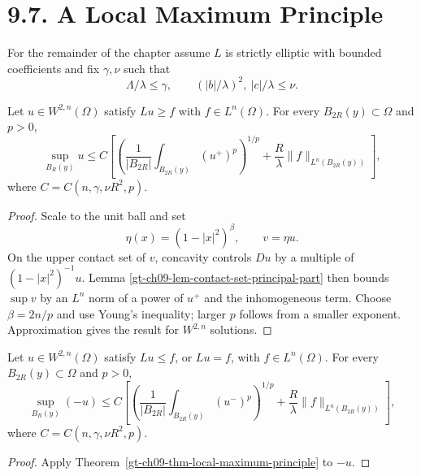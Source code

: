 \section*{9.7. A Local Maximum Principle}

For the remainder of the chapter assume $L$ is strictly elliptic with bounded
coefficients and fix $\gamma,\nu$ such that
\begin{equation}\tag{9.47}
\Lambda/\lambda\le\gamma,
\qquad (|b|/\lambda)^2,\ |c|/\lambda\le\nu.
\end{equation}

\begin{theorem}
\label{gt-ch09-thm-local-maximum-principle}
Let $u\in W^{2,n}(\Omega)$ satisfy $Lu\ge f$ with $f\in L^n(\Omega)$.
For every $B_{2R}(y)\subset\Omega$ and $p>0$,
\begin{equation}\tag{9.48}
\sup_{B_R(y)}u\le C\left[
\left(\frac1{|B_{2R}|}\int_{B_{2R}(y)}(u^+)^p\right)^{1/p}
+\frac R\lambda\|f\|_{L^n(B_{2R}(y))}\right],
\end{equation}
where $C=C(n,\gamma,\nu R^2,p)$.
\end{theorem}
\begin{proof}
\sketch Scale to the unit ball and set
\begin{equation}
\tag{9.49}
\eta(x)=(1-|x|^2)^\beta,
\qquad v=\eta u.
\end{equation}
On the upper contact set of $v$, concavity controls
$Du$ by a multiple of $(1-|x|^2)^{-1}u$.  Lemma
\ref{gt-ch09-lem-contact-set-principal-part} then bounds $\sup v$ by an
$L^n$ norm of a power of $u^+$ and the inhomogeneous term.  Choose
$\beta=2n/p$ and use Young's inequality; larger $p$ follows from a smaller
exponent.  Approximation gives the result for $W^{2,n}$ solutions.
\end{proof}

\begin{corollary}
\label{gt-ch09-cor-local-minimum-principle}
Let $u\in W^{2,n}(\Omega)$ satisfy $Lu\le f$, or $Lu=f$, with
$f\in L^n(\Omega)$.  For every $B_{2R}(y)\subset\Omega$ and $p>0$,
\begin{equation}\tag{9.50}
\sup_{B_R(y)}(-u)\le C\left[
\left(\frac1{|B_{2R}|}\int_{B_{2R}(y)}(u^-)^p\right)^{1/p}
+\frac R\lambda\|f\|_{L^n(B_{2R}(y))}\right],
\end{equation}
where $C=C(n,\gamma,\nu R^2,p)$.
\end{corollary}
\begin{proof}
\sketch Apply Theorem~\ref{gt-ch09-thm-local-maximum-principle} to $-u$.
\end{proof}


